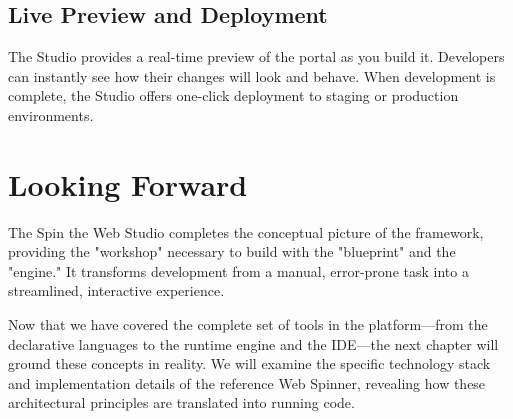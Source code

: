 \subsection{Live Preview and Deployment}
The Studio provides a real-time preview of the portal as you build it. Developers can instantly see how their changes will look and behave. When development is complete, the Studio offers one-click deployment to staging or production environments.

\section{Looking Forward}
\label{sec:studio-forward}

The Spin the Web Studio completes the conceptual picture of the framework, providing the "workshop" necessary to build with the "blueprint" and the "engine." It transforms \webbase{} development from a manual, error-prone task into a streamlined, interactive experience.

Now that we have covered the complete set of tools in the platform—from the declarative languages to the runtime engine and the IDE—the next chapter will ground these concepts in reality. We will examine the specific technology stack and implementation details of the reference Web Spinner, revealing how these architectural principles are translated into running code.
